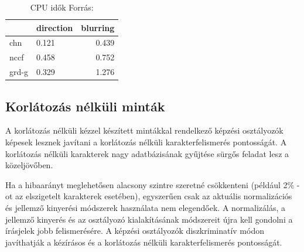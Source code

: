 \begin{table}[h]
\centering
\captionsetup{justification=centering}
\begin{tabular}{|l|l|r|}
\hline
\multicolumn{1}{|c|}{} & direction & blurring \\ \hline
chn                    & 0.121     & 0.439    \\ \hline
nccf                   & 0.458     & 0.752    \\ \hline
grd-g                  & 0.329     & 1.276    \\ \hline
\end{tabular}
\caption{CPU idők \hspace{\textwidth}Forrás: \cite{liu2008handwritten}}
\label{cpu_times}
\end{table}

\subsection{Korlátozás nélküli minták}
A korlátozás nélküli kézzel készített mintákkal rendelkező képzési osztályozók képesek lesznek javítani a korlátozás nélküli karakterfelismerés pontosságát. A korlátozás nélküli karakterek nagy adatbázisának gyűjtése sürgős feladat lesz a közeljövőben.

Ha a hibaarányt meglehetősen alacsony szintre szeretné csökkenteni (például 2\% -ot az elszigetelt karakterek esetében), egyszerűen csak az aktuális normalizációs és jellemző kinyerési módszerek használata nem elegendőek. A normalizálás, a jellemző kinyerés és az osztályozó kialakításának módszereit újra kell gondolni a írásjelek jobb felismerésére. A képzési osztályozók diszkriminatív módon javíthatják a kézírásos és a korlátozás nélküli karakterfelismerés pontosságát.